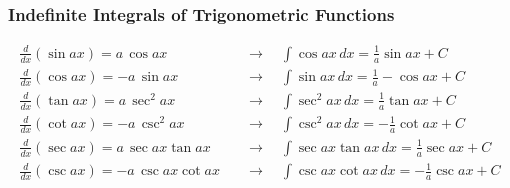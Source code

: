 \subsubsection{Indefinite Integrals of Trigonometric Functions}
\begin{align}
    \frac{d}{dx}(\sin ax) = a\, \cos ax \quad&\rightarrow\quad \int \cos ax\, dx = \frac{1}{a} \sin ax + C \\
    \frac{d}{dx}(\cos ax) = -a\, \sin ax \quad&\rightarrow\quad \int \sin ax\, dx = \frac{1}{a} -\cos ax + C \\
    \frac{d}{dx}(\tan ax) = a\, \sec^2 ax \quad&\rightarrow\quad \int \sec^2 ax\, dx = \frac{1}{a} \tan ax + C \\
    \frac{d}{dx}(\cot ax) = -a\, \csc^2 ax \quad&\rightarrow\quad \int \csc^2 ax\, dx = -\frac{1}{a} \cot ax + C \\
    \frac{d}{dx}(\sec ax) = a\, \sec ax \tan ax \quad&\rightarrow\quad \int \sec ax \tan ax \, dx = \frac{1}{a} \sec ax + C \\
    \frac{d}{dx}(\csc ax) = -a\, \csc ax \cot ax \quad&\rightarrow\quad \int \csc ax \cot ax\, dx = -\frac{1}{a} \csc ax + C 
\end{align}
